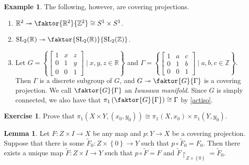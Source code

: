 \documentclass[10pt,letterpaper,cm]{nupset}
\theoremstyle{definition}
\newtheorem{exmp}[definition]{Example}
\theoremstyle{theorem}
\newtheorem{lemma}[definition]{Lemma}
\newtheorem{exercise}[definition]{Exercise}
\theoremstyle{remark}
\newcommand{\R}{\mathbb{R}}
\newcommand{\Z}{\mathbb Z}
\newcommand{\1}{\mathbb{1}}
\newcommand{\0}{\vec 0}
\DeclareMathOperator{\SL}{SL}
\begin{document}
\pagebreak

\begin{exmp} The following, however, are covering projections.
\begin{enumerate}
\item $\R^2 \twoheadrightarrow \faktor{\R^2}{\Z^2} \cong S^1 \times S^1$.
\item $\SL_2(\R) \twoheadrightarrow \faktor{\SL_2(\R)}{\SL_2(\Z)}$.
\item Let $G = \left \{ \begin{bmatrix} 1 & x & z \\ 0 & 1 & y \\ 0 & 0 & 1 \end{bmatrix}  \mid x,y,z \in \R \right \}$ and $\Gamma = \left \{ \begin{bmatrix} 1 & a & c \\  0 & 1 & b \\  0 & 0 & 1 \end{bmatrix} \mid a,b,c \in \Z \right \}$. Then $\Gamma$ is a discrete subgroup of $G$, and $G \twoheadrightarrow \faktor{G}{\Gamma}$ is a covering projection. We call $\faktor{G}{\Gamma}$ an \textit{Iwasawa manifold}.
Since $G$ is simply connected, we also have that $\pi_1 \left(\faktor{G}{\Gamma} \right) \cong \Gamma$ by \cref{actiso}.
\end{enumerate}
\end{exmp}

\smallskip

\begin{exercise}
Prove that $\pi_1(X \times Y, (x_0, y_0)) \cong \pi_1\left(X, x_0\right) \times \pi_1\left(Y, y_0\right)$.
\end{exercise}

\smallskip

\begin{lemma}
Let $F : Z \times I \to X$ be any map and $p: Y \to X$ be a covering projection. Suppose that there is some $\widetilde{F}_0 : Z \times \left\{0\right\} \to Y$ such that $p \circ \widetilde{F}_0 = F_0$. Then there exists a unique map $\widetilde{F} : Z \times I \to Y$ such that $p \circ \widetilde{F} = F$ and $\widetilde{F} \restriction_{Z\times \left\{0\right\}} = \widetilde{F}_0$.
\end{lemma}
\end{document}
